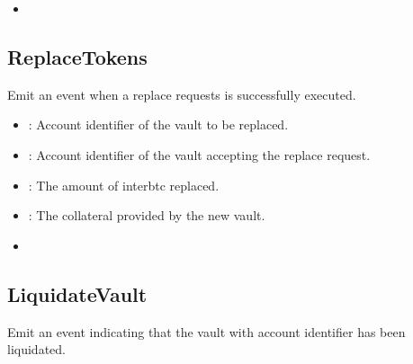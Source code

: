 \documentclass[a4paper,10pt,english]{sphinxmanual}
\begin{document}
\begin{itemize}
\item {} 
{\hyperref[\detokenize{spec/vault-registry:redeemtokens}]{}}

\end{itemize}


\subsection{ReplaceTokens}
\label{\detokenize{spec/vault-registry:id50}}
Emit an event when a replace requests is successfully executed.



\begin{itemize}
\item {} 
: Account identifier of the vault to be replaced.

\item {} 
: Account identifier of the vault accepting the replace request.

\item {} 
: The amount of interbtc replaced.

\item {} 
: The collateral provided by the new vault.

\end{itemize}

\begin{itemize}
\item {} 
{\hyperref[\detokenize{spec/vault-registry:replacetokens}]{}}

\end{itemize}


\subsection{LiquidateVault}
\label{\detokenize{spec/vault-registry:id51}}
Emit an event indicating that the vault with  account identifier has been liquidated.
\end{document}
